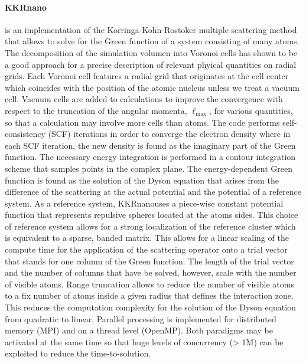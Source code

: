 \documentclass{llncs}
\newcommand{\ellmax}{\ell_{\mathrm{max}}}
\def\KKRnano{{KKRnano}}
\begin{document}
\paragraph{KKRnano} \label{section:kkrnano}
is an implementation of the Korringa-Kohn-Rostoker multiple scattering method \cite{korringa, kohn-rostoker}
that allows to solve for the Green function of a system consisting of many atoms.
The decomposition of the simulation volumen into Voronoi cells has shown to be a good
approach for a precise description of relevant phyical quantities on radial grids.
Each Voronoi cell features a radial grid that originates at the cell center
which coincides with the position of the atomic nucleus unless we treat a vacuum cell.
Vacuum cells are added to calculations to improve the convergence with respect to the truncation of
the angular momenta, $\ellmax$, for various quantities, so that a calculation may involve more cells than atoms.
The code performs self-consistency (SCF) iterations in order to converge the electron density
where in each SCF iteration, the new density is found as the imaginary part of the Green function.
The necessary energy integration is performed in a contour integration scheme that
samples points in the complex plane.
The energy-dependent Green function is found as the solution of the Dyson equation
that arises from the difference of the scattering at the actual potential and the potential 
of a reference system. As a reference system, \KKRnano uses a piece-wise constant potential
function that represents repulsive spheres located at the atoms sides.
This choice of reference system allows for a strong localization of the reference cluster
which is equivalent to a sparse, banded matrix. 
This allows for a linear scaling of the compute time for the application of the scattering operator
onto a trial vector that stands for one column of the Green function. 
The length of the trial vector and the number of columns that have be solved, however, scale with
the number of visible atoms.
Range truncation allows to reduce the number of visible atoms to a fix number 
of atoms inside a given radius that defines the interaction zone. This reduces the computation
complexity for the solution of the Dyson equation from quadratic to linear.
Parallel processing is implemented for distributed memory (MPI) and on a thread level (OpenMP).
Both paradigms may be activated at the same time so that huge levels of concurrency 
(> 1M) can be exploited to reduce the time-to-solution.
\end{document}
